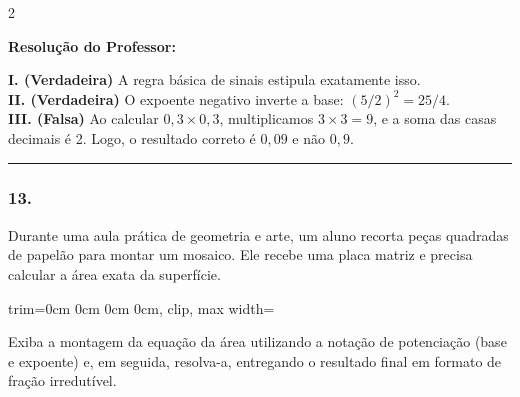 \begin{multicols*}{2}
\ifgabarito
    \begin{tcolorbox}[colback=CorTitUm!5, colframe=CorTitUm, boxrule=1pt, arc=4pt, left=6pt, right=6pt, top=6pt, bottom=6pt]
    \small\textbf{\textcolor{CorTitUm}{Resolução do Professor:}}\par\vspace{0.1cm}
    \color{CinzaEscuro}
    \textbf{I. (Verdadeira)} A regra básica de sinais estipula exatamente isso.\\
    \textbf{II. (Verdadeira)} O expoente negativo inverte a base: $ (5/2)^2 = 25/4 $.\\
    \textbf{III. (Falsa)} Ao calcular $ 0,3 \times 0,3 $, multiplicamos $ 3 \times 3 = 9 $, e a soma das casas decimais é 2. Logo, o resultado correto é $ 0,09 $ e não $ 0,9 $.
    \end{tcolorbox}
\fi

\par\vspace{\espacoQuestao}

\noindent\textcolor{CorLinha}{\rule{\linewidth}{0.5pt}} 
\par\vspace{\espacoPreQuestao}
\subsubsection*{13.} Durante uma aula prática de geometria e arte, um aluno recorta peças quadradas de papelão para montar um mosaico. Ele recebe uma placa matriz e precisa calcular a área exata da superfície.
\begin{center}
\begin{adjustbox}{trim=0cm 0cm 0cm 0cm, clip, max width=\larguraTikz}
\end{adjustbox}
\end{center}
Exiba a montagem da equação da área utilizando a notação de potenciação (base e expoente) e, em seguida, resolva-a, entregando o resultado final em formato de fração irredutível.


\end{multicols*}
